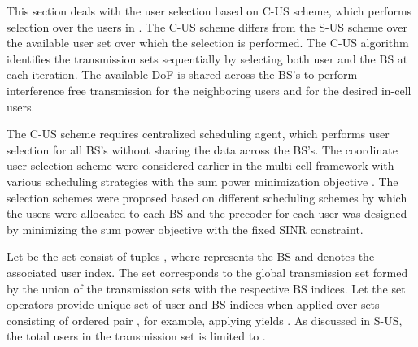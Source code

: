 
This section deals with the user selection based on \ac{C-US} scheme, which performs selection over the users in . The \ac{C-US} scheme differs from the \ac{S-US} scheme over the available user set over which the selection is performed. The \ac{C-US} algorithm identifies the transmission sets  sequentially by selecting both user and the \ac{BS} at each iteration. The available \ac{DoF} is shared across the \ac{BS}'s to perform interference free transmission for the neighboring users and for the desired in-cell users.

The \ac{C-US} scheme requires centralized scheduling agent, which performs user selection for all \ac{BS}'s without sharing the data across the \ac{BS}'s. The coordinate user selection scheme were considered earlier in the multi-cell framework with various scheduling strategies with the sum power minimization objective \cite{antti_coord_user_selection}. The selection schemes were proposed based on different scheduling schemes by which the users were allocated to each \ac{BS} and the precoder for each user was designed by minimizing the sum power objective with the fixed \ac{SINR} constraint.

Let  be the set consist of tuples , where  represents the \ac{BS} and  denotes the associated user index. The set  corresponds to the global transmission set formed by the union of the transmission sets  with the respective \ac{BS} indices. Let the set operators  provide unique set of user and \ac{BS} indices when applied over sets consisting of ordered pair , for example, applying  yields . As discussed in \ac{S-US}, the total users in the transmission set is limited to .

